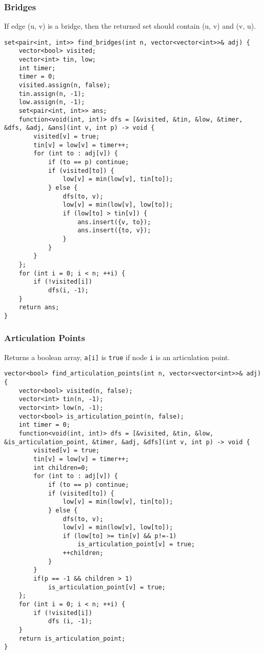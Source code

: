 \documentclass[8pt, headheight=10pt, a4paper]{article}
\begin{document}
\begin{multicols*}{3}
\subsubsection{Bridges}
If edge (u, v) is a bridge, then the returned set should contain (u, v) and (v, u). 
\begin{lstlisting}
set<pair<int, int>> find_bridges(int n, vector<vector<int>>& adj) {
    vector<bool> visited;
    vector<int> tin, low;
    int timer;
    timer = 0;
    visited.assign(n, false);
    tin.assign(n, -1);
    low.assign(n, -1);
    set<pair<int, int>> ans;
    function<void(int, int)> dfs = [&visited, &tin, &low, &timer, &dfs, &adj, &ans](int v, int p) -> void {
        visited[v] = true;
        tin[v] = low[v] = timer++;
        for (int to : adj[v]) {
            if (to == p) continue;
            if (visited[to]) {
                low[v] = min(low[v], tin[to]);
            } else {
                dfs(to, v);
                low[v] = min(low[v], low[to]);
                if (low[to] > tin[v]) {
                    ans.insert({v, to});
                    ans.insert({to, v});
                }
            }
        }
    };
    for (int i = 0; i < n; ++i) {
        if (!visited[i])
            dfs(i, -1);
    }
    return ans;
}
\end{lstlisting}

\subsubsection{Articulation Points}
Returns a boolean array, \lstinline{a[i]} is \lstinline{true} if node \lstinline{i} is an articulation point. 
\begin{lstlisting}
vector<bool> find_articulation_points(int n, vector<vector<int>>& adj) {
    vector<bool> visited(n, false);
    vector<int> tin(n, -1);
    vector<int> low(n, -1);
    vector<bool> is_articulation_point(n, false);
    int timer = 0;
    function<void(int, int)> dfs = [&visited, &tin, &low, &is_articulation_point, &timer, &adj, &dfs](int v, int p) -> void {
        visited[v] = true;
        tin[v] = low[v] = timer++;
        int children=0;
        for (int to : adj[v]) {
            if (to == p) continue;
            if (visited[to]) {
                low[v] = min(low[v], tin[to]);
            } else {
                dfs(to, v);
                low[v] = min(low[v], low[to]);
                if (low[to] >= tin[v] && p!=-1)
                    is_articulation_point[v] = true;
                ++children;
            }
        }
        if(p == -1 && children > 1)
            is_articulation_point[v] = true;
    };
    for (int i = 0; i < n; ++i) {
        if (!visited[i])
            dfs (i, -1);
    }
    return is_articulation_point;
}
\end{lstlisting}


\end{multicols*}
\end{document}
